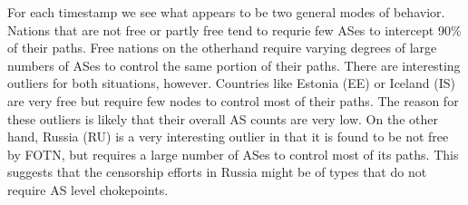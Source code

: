 \documentclass[10pt, conference, letterpaper]{IEEEtran}
\begin{document}
\par
For each timestamp we see what appears to be two general modes of behavior. Nations that are not free or partly free tend to requrie few ASes
to intercept 90\% of their paths. Free nations on the otherhand require varying degrees of large numbers of ASes to control the same portion
of their paths. There are interesting outliers for both situations, however. Countries like Estonia (EE) or Iceland (IS) are very free but require
few nodes to control most of their paths. The reason for these outliers is likely that their overall AS counts are very low. On the other hand, Russia (RU)
is a very interesting outlier in that it is found to be not free by FOTN, but requires a large number of ASes to control most of its paths. This suggests
that the censorship efforts in Russia might be of types that do not require AS level chokepoints.
\end{document}
